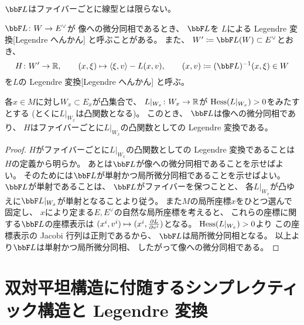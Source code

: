 \documentclass[report]{jlreq}
\begin{document}
\begin{remark}
    $\bbF L$はファイバーごとに線型とは限らない。
\end{remark}

\begin{definition}
    $\bbF L \colon W \to E^\vee$が
    像への微分同相であるとき、
    $\bbF L$を
    $L$による
        {Legendre 変換}[Legendre へんかん]
    と呼ぶことがある。
    また、
    $W' \coloneqq \bbF L(W) \subset E^\vee$とおき、
    \begin{equation}
        H \colon W' \to \R,
            \qquad
            (x, \xi) \mapsto \myangle{\xi}{v} - L(x, v),
            \qquad
            (x, v) \coloneqq (\bbF L)^{-1}(x, \xi) \in W
    \end{equation}
    を$L$の
        {Legendre 変換}[Legendre へんかん]
    と呼ぶ。
\end{definition}

\begin{proposition}
    各$x \in M$に対し$W_x \subset E_x$が凸集合で、
    $L|_{W_x} \colon W_x \to \mathbb{R}$が
    $\operatorname{Hess} (L|_{W_x}) > 0$をみたすとする
    (とくに$L|_{W_x}$は凸関数となる)。
    このとき、
    $\bbF L$は像への微分同相であり、
    $H$はファイバーごとに$L|_{W_x}$の凸関数としての Legendre 変換である。
\end{proposition}

\begin{proof}
    $H$がファイバーごとに$L|_{W_x}$の凸関数としての Legendre 変換であることは
    $H$の定義から明らか。
    あとは$\bbF L$が像への微分同相であることを示せばよい。
    そのためには$\bbF L$が単射かつ局所微分同相であることを示せばよい。
    $\bbF L$が単射であることは、
    $\bbF L$がファイバーを保つことと、
    各$L|_{W_x}$が凸ゆえに$\bbF L|_{W_x}$が単射となることより従う。
    また$M$の局所座標$x$をひとつ選んで固定し、
    $x$により定まる$E, E^\vee$の自然な局所座標を考えると、
    これらの座標に関する$\bbF L$の座標表示は
    $(x^i, v^i) \mapsto (x^i, \deldel[L]{v^i})$となる。
    $\operatorname{Hess} (L|_{W_x}) > 0$より
    この座標表示の Jacobi 行列は正則であるから、
    $\bbF L$は局所微分同相となる。
    以上より$\bbF L$は単射かつ局所微分同相、
    したがって像への微分同相である。
\end{proof}

%
\section{双対平坦構造に付随するシンプレクティック構造と Legendre 変換}
\end{document}
